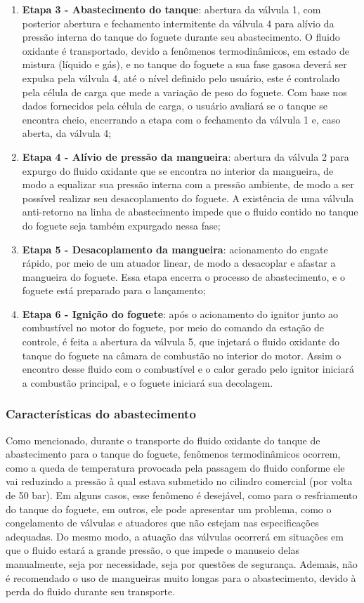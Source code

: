 \begin{enumerate}
    \item \textbf{Etapa 3 - Abastecimento do tanque}: abertura da válvula 1, com posterior abertura e fechamento intermitente da válvula 4 para alívio da pressão interna do tanque do foguete durante seu abastecimento. O fluido oxidante é transportado, devido a fenômenos termodinâmicos, em estado de mistura (líquido e gás), e no tanque do foguete a sua fase gasosa deverá ser expulsa pela válvula 4, até o nível definido pelo usuário, este é controlado pela célula de carga que mede a variação de peso do foguete. Com base nos dados fornecidos pela célula de carga, o usuário avaliará se o tanque se encontra cheio, encerrando a etapa com o fechamento da válvula 1 e, caso aberta, da válvula 4; 
    \item \textbf{Etapa 4 - Alívio de pressão da mangueira}: abertura da válvula 2 para expurgo do fluido oxidante que se encontra no interior da mangueira, de modo a equalizar sua pressão interna com a pressão ambiente, de modo a ser possível realizar seu desacoplamento do foguete. A existência de uma válvula anti-retorno na linha de abastecimento impede que o fluido contido no tanque do foguete seja também expurgado nessa fase; 
    \item \textbf{Etapa 5 - Desacoplamento da mangueira}: acionamento do engate rápido, por meio de um atuador linear, de modo a desacoplar e afastar a mangueira do foguete. Essa etapa encerra o processo de abastecimento, e o foguete está preparado para o lançamento; 
    \item \textbf{Etapa 6 - Ignição do foguete}: após o acionamento do ignitor junto ao combustível no motor do foguete, por meio do comando da estação de controle, é feita a abertura da válvula 5, que injetará o fluido oxidante do tanque do foguete na câmara de combustão no interior do motor. Assim o encontro desse fluido com o combustível e o calor gerado pelo ignitor iniciará a combustão principal, e o foguete iniciará sua decolagem.
\end{enumerate}

\subsubsection{Características do abastecimento}

\par Como mencionado, durante o transporte do fluido oxidante do tanque de abastecimento para o tanque do foguete, fenômenos termodinâmicos ocorrem, como a queda de temperatura provocada pela passagem do fluido conforme ele vai reduzindo a pressão à qual estava submetido no cilindro comercial (por volta de 50 bar). Em alguns casos, esse fenômeno é desejável, como para o resfriamento do tanque do foguete, em outros, ele pode apresentar um problema, como o congelamento de válvulas e atuadores que não estejam nas especificações adequadas. Do mesmo modo, a atuação das válvulas ocorrerá em situações em que o fluido estará a grande pressão, o que impede o manuseio delas manualmente, seja por necessidade, seja por questões de segurança. Ademais, não é recomendado o uso de mangueiras muito longas para o abastecimento, devido à perda do fluido durante seu transporte.

